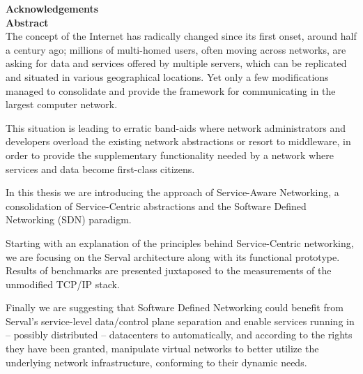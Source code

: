 \documentclass[12pt,a4paper,oneside]{article}
\begin{document}

\newpage
\pagestyle{empty}
\mbox{}

\newpage
\setcounter{page}{2}



\newpage
\pagestyle{plain}
{\Large \bf \noindent Acknowledgements} \\[0.5cm]



\newpage
\thispagestyle{empty}
{\Large \bf \noindent Abstract} \\[0.13cm]

\noindent The concept of the Internet has radically changed since its first onset, around half a century ago; millions of multi-homed users, often moving across networks, are asking for data and services offered by multiple servers, which can be replicated and situated in various geographical locations.
Yet only a few modifications managed to consolidate and provide the framework for communicating in the largest computer network.

This situation is leading to erratic band-aids where network administrators and developers overload the existing network abstractions or resort to middleware, in order to provide the supplementary functionality needed by a network where services and data become first-class citizens.

In this thesis we are introducing the approach of Service-Aware Networking, a consolidation of Service-Centric abstractions and the Software Defined Networking (SDN) paradigm.

Starting with an explanation of the principles behind Service-Centric networking, we are focusing on the Serval architecture along with its functional prototype.
Results of benchmarks are presented juxtaposed to the measurements of the unmodified TCP/IP stack.

Finally we are suggesting that Software Defined Networking could benefit from Serval's service-level data/control plane separation and enable services running in – possibly distributed – datacenters to automatically, and according to the rights they have been granted, manipulate virtual networks to better utilize the underlying network infrastructure, conforming to their dynamic needs.\\[0.1cm]
\end{document}
